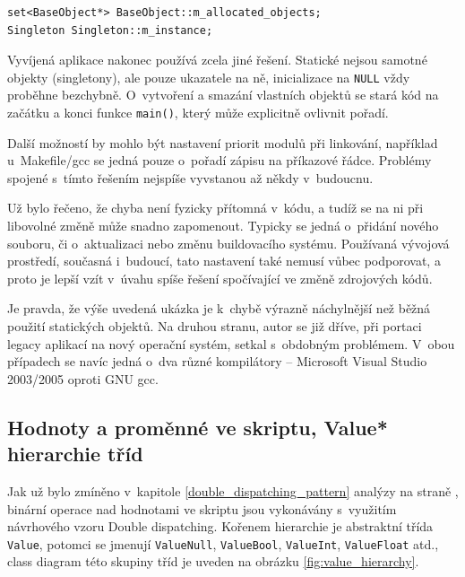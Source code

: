 \documentclass[11pt,twoside,a4paper]{book}
\begin{document}
\begin{verbatim}
set<BaseObject*> BaseObject::m_allocated_objects;
Singleton Singleton::m_instance;
\end{verbatim}

Vyvíjená aplikace nakonec používá zcela jiné řešení. Statické nejsou samotné objekty (singletony), ale pouze ukazatele na ně, inicializace na \texttt{NULL} vždy proběhne bezchybně. O~vytvoření a smazání vlastních objektů se stará kód na začátku a konci funkce \texttt{main()}, který může explicitně ovlivnit pořadí.

Další možností by mohlo být nastavení priorit modulů při linkování, například u~Makefile/gcc se jedná pouze o~pořadí zápisu na příkazové řádce. Problémy spojené s~tímto řešením nejspíše vyvstanou až někdy v~budoucnu.

Už bylo řečeno, že chyba není fyzicky přítomná v~kódu, a tudíž se na ni při libovolné změně může snadno zapomenout. Typicky se jedná o~přidání nového souboru, či o~aktualizaci nebo změnu buildovacího systému. Používaná vývojová prostředí, současná i~budoucí, tato nastavení také nemusí vůbec podporovat, a proto je lepší vzít v~úvahu spíše řešení spočívající ve změně zdrojových kódů.

Je pravda, že výše uvedená ukázka je k~chybě výrazně náchylnější než běžná použití statických objektů. Na druhou stranu, autor se již dříve, při portaci legacy aplikací na nový operační systém, setkal s~obdobným problémem. V~obou případech se navíc jedná o~dva různé kompilátory -- Microsoft Visual Studio 2003/2005 oproti GNU gcc.


\subsection{Hodnoty a proměnné ve skriptu, Value* hierarchie tříd}

Jak už bylo zmíněno v~kapitole \ref{double_dispatching_pattern} analýzy na straně \pageref{double_dispatching_pattern}, binární operace nad hodnotami ve skriptu jsou vykonávány s~využitím návrhového vzoru Double dispatching. Kořenem hierarchie je abstraktní třída \texttt{Value}, potomci se jmenují \texttt{ValueNull}, \texttt{Va\-lue\-Bool}, \texttt{ValueInt}, \texttt{ValueFloat} atd., class diagram této skupiny tříd je uveden na obrázku \ref{fig:value_hierarchy}.
\end{document}
